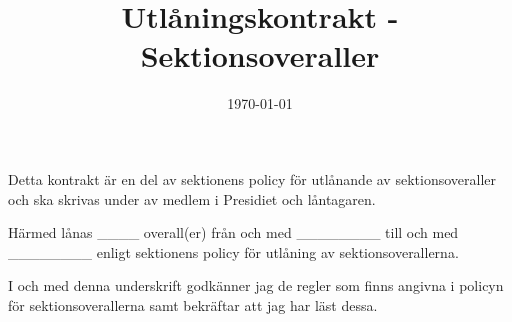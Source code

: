 \documentclass{dtek}
\title{Utlåningskontrakt - Sektionsoveraller}
\date{\today} %
\begin{document}
\makeheadfoot
\maketitle

\vspace{5mm}

Detta kontrakt är en del av sektionens policy för utlånande av sektionsoveraller och ska skrivas under av medlem i Presidiet och låntagaren.

Härmed lånas \_\_\_\_ overall(er) från och med \_\_\_\_\_\_\_\_ till och med \_\_\_\_\_\_\_\_ enligt sektionens policy för utlåning av sektionsoverallerna.

I och med denna underskrift godkänner jag de regler som finns angivna i policyn för sektionsoverallerna samt bekräftar att jag har läst dessa.

 \\
 \\
\end{document}
